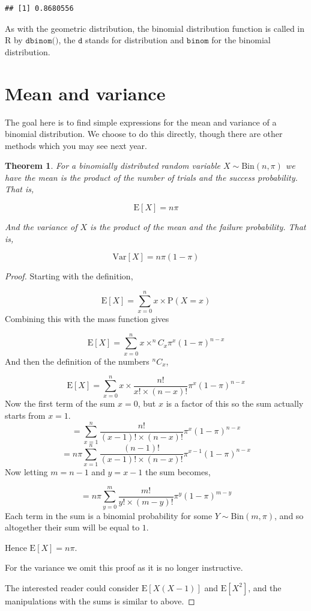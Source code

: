 \documentclass[
]{book}
\newtheorem{theorem}{Theorem}[chapter]
\theoremstyle{definition}
\theoremstyle{definition}
\theoremstyle{definition}
\theoremstyle{definition}
\theoremstyle{remark}
\begin{document}
\begin{verbatim}
## [1] 0.8680556
\end{verbatim}

As with the geometric distribution, the binomial distribution function is called in R by \(\texttt{dbinom()}\), the \(\texttt{d}\) stands for distribution and \(\texttt{binom}\) for the binomial distribution.

\hypertarget{mean-and-variance}{%
\section{Mean and variance}\label{mean-and-variance}}

The goal here is to find simple expressions for the mean and variance of a binomial distribution. We choose to do this directly, though there are other methods which you may see next year.

\begin{theorem}
For a binomially distributed random variable \(X\sim \text{Bin}(n,\pi)\) we have the mean is the product of the number of trials and the success probability. That is,

\[\text{E}[X] = n\pi \]

And the variance of \(X\) is the product of the mean and the failure probability. That is,

\[ \text{Var}[X] = n\pi (1-\pi)\]
\end{theorem}

\begin{proof}
Starting with the definition,

\[ \text{E}[X] = \sum_{x=0}^{n}x\times \text{P}(X=x)\]
Combining this with the mass function gives

\[ \text{E}[X] = \sum_{x=0}^{n}x\times ^{n}C_{x} \pi^x (1-\pi)^{n-x} \]
And then the definition of the numbers \(^{n}C_{x}\),

\[ \text{E}[X] = \sum_{x=0}^{n}x\times \frac{n!}{x!\times(n-x)!} \pi^x (1-\pi)^{n-x} \]
Now the first term of the sum \(x=0\), but \(x\) is a factor of this so the sum actually starts from \(x=1\).
\[  = \sum_{x=1}^{n} \frac{n!}{(x-1)!\times(n-x)!} \pi^x (1-\pi)^{n-x} \]
\[  = n\pi\sum_{x=1}^{n} \frac{(n-1)!}{(x-1)!\times(n-x)!} \pi^{x-1} (1-\pi)^{n-x} \]
Now letting \(m=n-1\) and \(y=x-1\) the sum becomes,

\[  = n\pi\sum_{y=0}^{m} \frac{m!}{y!\times(m-y)!} \pi^{y} (1-\pi)^{m-y} \]
Each term in the sum is a binomial probability for some \(Y\sim \text{Bin}(m,\pi)\), and so altogether their sum will be equal to \(1\).

Hence \(\text{E}[X] = n\pi\).

For the variance we omit this proof as it is no longer instructive.

The interested reader could consider \(\text{E}[X(X-1)]\) and \(\text{E}[X^2]\), and the manipulations with the sums is similar to above.
\end{proof}
\end{document}

